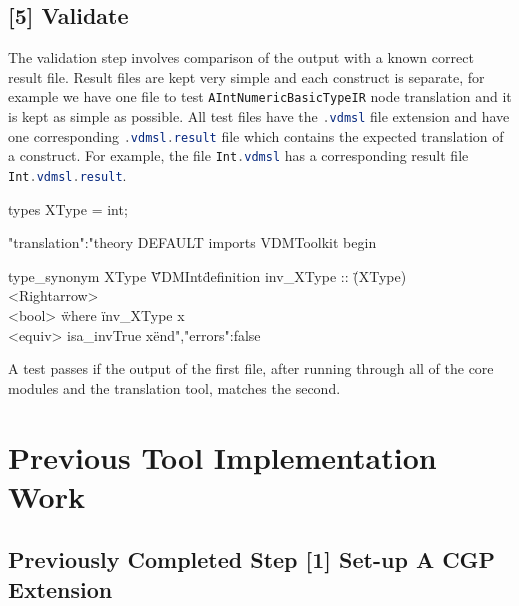 	\subsection{	[5] Validate} \label{vdt}
	The validation step involves comparison of the output with a known correct result file. Result files are kept very simple and each construct is separate, for example we have one file to test \lstinline[language=Java]{AIntNumericBasicTypeIR} node translation and it is kept as simple as possible. All test files have the \lstinline[language=Java]{.vdmsl} file extension and have one corresponding \lstinline[language=Java]{.vdmsl.result} file which contains the expected translation of a construct. For example, the file \lstinline[language=Java]{Int.vdmsl} has a corresponding result file \lstinline[language=Java]{Int.vdmsl.result}. 
	\begin{vdmsl}[label=lst:Int.vdmsl,caption=Int.vdmsl]
	types
	XType = int;
	\end{vdmsl}
	\begin{vdmsl}[label=lst:Int.vdmsl.result, caption=Int.vdmsl.result]
	{"translation":"theory DEFAULT
	imports VDMToolkit
	begin

	type_synonym XType \= \"VDMInt\"




	definition
	    inv_XType :: \"(XType) \\<Rightarrow> \\<bool> \"
	    where
	    \"inv_XType x \\<equiv> isa_invTrue x\"

	end","errors":false}
	\end{vdmsl}  
	A test passes if the output of the first file, after running through all of the core modules and the translation tool, matches the second.

	\section{Previous Tool Implementation Work}
	\subsection{Previously Completed Step [1] Set-up A CGP Extension}

